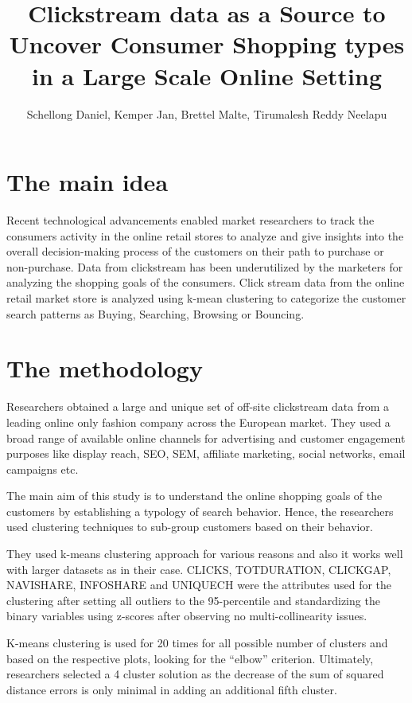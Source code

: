 \documentclass[a4paper]{article}
\title{Clickstream data as a Source to Uncover Consumer Shopping types in a Large Scale Online Setting}
\author[1]{Schellong Daniel, Kemper Jan, Brettel Malte, Tirumalesh Reddy Neelapu}
\begin{document}
\maketitle
\section{The main idea}

Recent technological advancements enabled market researchers to track the consumers activity in the online retail stores to analyze and give insights into the overall decision-making process of the customers on their path to purchase or non-purchase. Data from clickstream has been underutilized by the marketers for analyzing the shopping goals of the consumers. Click stream data from the online retail market store is analyzed using k-mean clustering to categorize the customer search patterns as Buying, Searching, Browsing or Bouncing.  

\section{The methodology }

Researchers obtained a large and unique set of off-site clickstream data from a leading online only fashion company across the European market. They used a broad range of available online channels for advertising and customer engagement purposes like display reach, SEO, SEM, affiliate marketing, social networks, email campaigns etc.

The main aim of this study is to understand the online shopping goals of the customers by establishing a typology of search behavior. Hence, the researchers used clustering techniques to sub-group customers based on their behavior. 

They used k-means clustering approach for various reasons and also it works well with larger datasets as in their case. CLICKS, TOTDURATION, CLICKGAP, NAVISHARE, INFOSHARE and UNIQUECH were the attributes used for the clustering after setting all outliers to the 95-percentile and standardizing the binary variables using z-scores after observing no multi-collinearity issues.

K-means clustering is used for 20 times for all possible number of clusters and based on the respective plots, looking for the “elbow” criterion. Ultimately, researchers selected a 4 cluster solution as the decrease of the sum of squared distance errors is only minimal in adding an additional fifth cluster.
\end{document}
